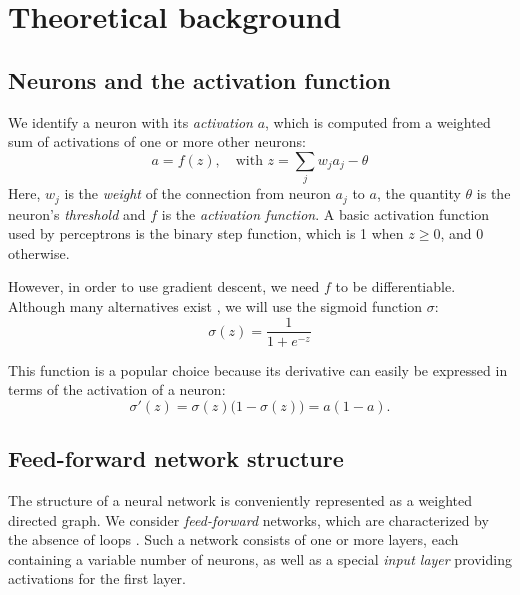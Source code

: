 \DeclarePairedDelimiter\norm{\lVert}{\rVert}
\DeclarePairedDelimiter\abs{\lvert}{\rvert}
\section{Theoretical background}

\subsection{Neurons and the activation function}

We identify a neuron with its \emph{activation} \(a\), which is computed from a weighted sum of activations of one or more other neurons:
\begin{equation}\label{eq-weighted-sum}
    a=f(z),\quad\text{with } z = \sum_j w_j a_j - \theta
\end{equation}
Here, \(w_j\) is the \emph{weight} of the connection from neuron \(a_j\) to \(a\), the quantity \(\theta\) is the neuron's \emph{threshold} and \(f\) is the \emph{activation function}. A basic activation function used by perceptrons is the binary step function, which is 1 when \(z\geq 0\), and 0 otherwise. 

However, in order to use gradient descent, we need \(f\) to be differentiable. Although many alternatives exist \cite{ok}, we will use the sigmoid function \(\sigma\):
\begin{equation*}
    \sigma(z)=\frac{1}{1+e^{-z}}
\end{equation*}

\noindent This function is a popular choice because its derivative can easily be expressed in terms of the activation of a neuron:
\begin{equation*}
    \sigma'(z)=\sigma(z)\big(1-\sigma(z)\big)=a(1-a).
\end{equation*}

\subsection{Feed-forward network structure}

The structure of a neural network is conveniently represented as a weighted directed graph. We consider \emph{feed-forward} networks, which are characterized by the absence of loops \cite{TODO}. Such a network consists of one or more layers, each containing a variable number of neurons, as well as a special \emph{input layer} providing activations for the first layer. 

